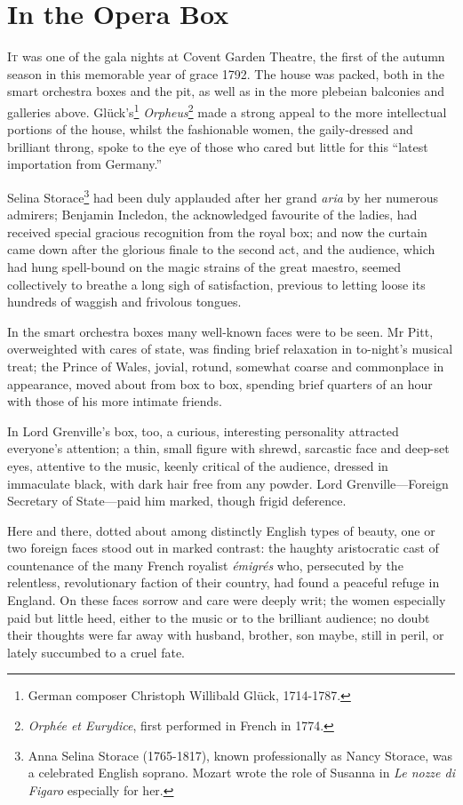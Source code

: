 
\chapter{In the Opera Box}
\lettrine[lines=4]{I}{t} was one of the gala nights at Covent Garden Theatre, the first of the autumn season in this memorable year of grace 1792. The house was packed, both in the smart orchestra boxes and the pit, as well as in the more plebeian balconies and galleries above. Glück's\footnote{German composer Christoph Willibald Glück, 1714-1787.} \textit{Orpheus}\footnote{\textit{Orphée et Eurydice}, first performed in French in 1774.} made a strong appeal to the more intellectual portions of the house, whilst the fashionable women, the gaily-dressed and brilliant throng, spoke to the eye of those who cared but little for this \enquote{latest importation from Germany.}

Selina Storace\footnote{Anna Selina Storace (1765-1817), known professionally as Nancy Storace, was a celebrated English soprano. Mozart wrote the role of Susanna in \textit{Le nozze di Figaro} especially for her.} had been duly applauded after her grand \textit{aria} by her numerous admirers; Benjamin Incledon, the acknowledged favourite of the ladies, had received special gracious recognition from the royal box; and now the curtain came down after the glorious finale to the second act, and the audience, which had hung spell-bound on the magic strains of the great maestro, seemed collectively to breathe a long sigh of satisfaction, previous to letting loose its hundreds of waggish and frivolous tongues.

In the smart orchestra boxes many well-known faces were to be seen. Mr Pitt, overweighted with cares of state, was finding brief relaxation in to-night's musical treat; the Prince of Wales, jovial, rotund, somewhat coarse and commonplace in appearance, moved about from box to box, spending brief quarters of an hour with those of his more intimate friends.

In Lord Grenville's box, too, a curious, interesting personality attracted everyone's attention; a thin, small figure with shrewd, sarcastic face and deep-set eyes, attentive to the music, keenly critical of the audience, dressed in immaculate black, with dark hair free from any powder. Lord Grenville---Foreign Secretary of State---paid him marked, though frigid deference.

Here and there, dotted about among distinctly English types of beauty, one or two foreign faces stood out in marked contrast: the haughty aristocratic cast of countenance of the many French royalist \textit{émigrés} who, persecuted by the relentless, revolutionary faction of their country, had found a peaceful refuge in England. On these faces sorrow and care were deeply writ; the women especially paid but little heed, either to the music or to the brilliant audience; no doubt their thoughts were far away with husband, brother, son maybe, still in peril, or lately succumbed to a cruel fate.

